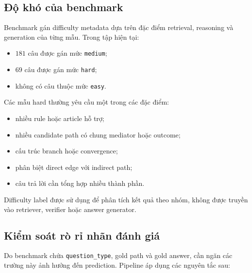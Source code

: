 \subsection{Độ khó của benchmark}

Benchmark gán difficulty metadata dựa trên đặc điểm retrieval, reasoning và
generation của từng mẫu. Trong tập hiện tại:

\begin{itemize}
    \item \(181\) câu được gán mức \texttt{medium};
    \item \(69\) câu được gán mức \texttt{hard};
    \item không có câu thuộc mức \texttt{easy}.
\end{itemize}

Các mẫu hard thường yêu cầu một trong các đặc điểm:

\begin{itemize}
    \item nhiều rule hoặc article hỗ trợ;
    \item nhiều candidate path có chung mediator hoặc outcome;
    \item cấu trúc branch hoặc convergence;
    \item phân biệt direct edge với indirect path;
    \item câu trả lời cần tổng hợp nhiều thành phần.
\end{itemize}

Difficulty label được sử dụng để phân tích kết quả theo nhóm, không được
truyền vào retriever, verifier hoặc answer generator.

\subsection{Kiểm soát rò rỉ nhãn đánh giá}

Do benchmark chứa \texttt{question\_type}, gold path và gold answer, cần
ngăn các trường này ảnh hưởng đến prediction. Pipeline áp dụng các nguyên
tắc sau:

